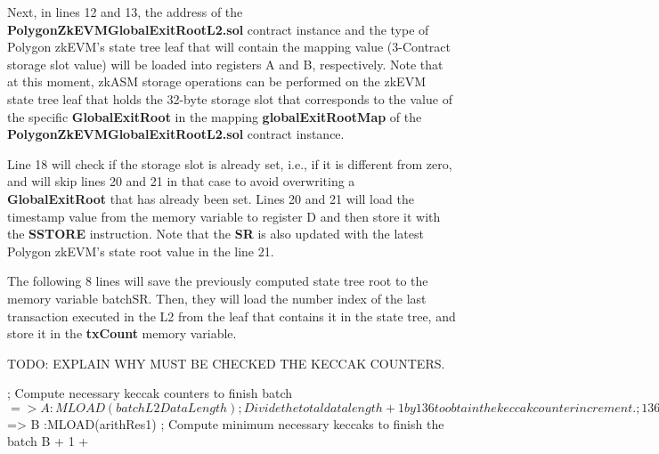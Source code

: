 Next, in lines 12 and 13, the address of the \textbf{PolygonZkEVMGlobalExitRootL2.sol} contract instance and the type of Polygon zkEVM's state tree leaf that will contain the mapping value (3-Contract storage slot value) will be loaded into registers A and B, respectively. Note that at this moment, zkASM storage operations can be performed on the zkEVM state tree leaf that holds the 32-byte storage slot that corresponds to the value of the specific \textbf{GlobalExitRoot} in the mapping \textbf{globalExitRootMap} of the \textbf{PolygonZkEVMGlobalExitRootL2.sol} contract instance.

Line 18 will check if the storage slot is already set, i.e., if it is different from zero, and will skip lines 20 and 21 in that case to avoid overwriting a \textbf{GlobalExitRoot} that has already been set. Lines 20 and 21 will load the timestamp value from the memory variable to register D and then store it with the \textbf{SSTORE} instruction. Note that the \textbf{SR} is also updated with the latest Polygon zkEVM's state root value in the line 21.

The following 8 lines will save the previously computed state tree root to the memory variable batchSR. Then, they will load the number index of the last transaction executed in the L2 from the leaf that contains it in the state tree, and store it in the \textbf{txCount} memory variable.

TODO: EXPLAIN WHY MUST BE CHECKED THE KECCAK COUNTERS.



\begin{zkasm}
    
    ; Compute necessary keccak counters to finish batch
    $ => A          :MLOAD(batchL2DataLength)
    ; Divide the total data length + 1 by 136 to obtain the keccak counter increment.
    ; 136 is the value used by the prover to increment keccak counters
    A + 1                                   :MSTORE(arithA)
    136                                     :MSTORE(arithB), CALL(divARITH); in: [arithA, arithB] out: [arithRes1: arithA/arithB, arithRes2: arithA%
    $ => B                                  :MLOAD(arithRes1)
    ; Compute minimum necessary keccaks to finish the batch
    B + 1 + %
\end{zkasm}



